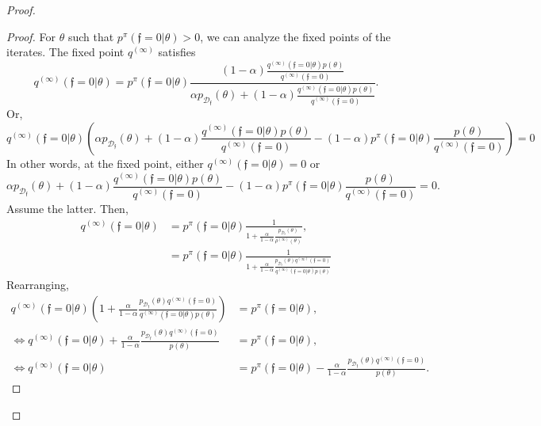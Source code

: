 \documentclass{article} %
\newcommand{\feas}{\mathfrak{f}}
\newcommand{\MeasuredCISet}{\mathcal{D}_{\feas{}}}
\begin{document}
\begin{proof}
\begin{proof}
For $\theta$ such that $p^\pi(\feas{}=0 | \theta) > 0$, we can analyze the fixed points of the iterates. The fixed point $q^{(\infty)}$ satisfies
\begin{equation}
    q^{(\infty)}(\feas{}=0 | \theta) = p^\pi(\feas{}=0 | \theta) \frac{ (1-\alpha) \frac{q^{(\infty)}(\feas{}=0|\theta) p(\theta) }{q^{(\infty)}(\feas{}=0)} }{ \alpha p_{\MeasuredCISet}(\theta) + (1-\alpha) \frac{q^{(\infty)}(\feas{}=0|\theta) p(\theta)}{q^{(\infty)}(\feas{}=0)} }.
\end{equation}
Or,
\begin{equation}
    q^{(\infty)}(\feas{}=0 | \theta)
    \left( \alpha p_{\MeasuredCISet}(\theta) + (1 - \alpha) \frac{ q^{(\infty)}(\feas{}=0|\theta) p(\theta) }{ q^{(\infty)}(\feas{}=0) } - (1-\alpha) p^\pi(\feas{}=0|\theta) \frac{p(\theta)}{q^{(\infty)}(\feas{}=0)} \right) = 0
\end{equation}
In other words, at the fixed point, either $q^{(\infty)}(\feas{}=0 | \theta) = 0$ or
\begin{equation}
    \alpha p_{\MeasuredCISet}(\theta) + (1 - \alpha) \frac{ q^{(\infty)}(\feas{}=0|\theta) p(\theta) }{ q^{(\infty)}(\feas{}=0) } - (1-\alpha) p^\pi(\feas{}=0|\theta) \frac{p(\theta)}{q^{(\infty)}(\feas{}=0)} = 0.
\end{equation}
Assume the latter. Then,
\begin{align}
    q^{(\infty)}(\feas{}=0 | \theta)
    &= p^\pi(\feas{}=0 | \theta) \frac{1}{1 + \frac{\alpha}{1-\alpha} \frac{ p_{\MeasuredCISet}(\theta) }{ \rho^{(\infty)}(\theta) } }, \\
    &= p^\pi(\feas{}=0 | \theta) \frac{1}{1 + \frac{\alpha}{1-\alpha} \frac{ p_{\MeasuredCISet}(\theta) q^{(\infty)}(\feas{} = 0) }{ q^{(\infty)}(\feas{}=0 | \theta) p(\theta) } }
\end{align}
Rearranging,
\begin{align}
    q^{(\infty)}(\feas{}=0 | \theta) \left(1 + \frac{\alpha}{1-\alpha} \frac{ p_{\MeasuredCISet}(\theta) q^{(\infty)}(\feas{} = 0) }{ q^{(\infty)}(\feas{}=0 | \theta) p(\theta) } \right)
    &= p^\pi(\feas{}=0 | \theta), \\
    \iff
    q^{(\infty)}(\feas{}=0 | \theta) + \frac{\alpha}{1-\alpha} \frac{ p_{\MeasuredCISet}(\theta) q^{(\infty)}(\feas{} = 0) }{ p(\theta) }
    &= p^\pi(\feas{}=0 | \theta), \\
    \iff
    q^{(\infty)}(\feas{}=0 | \theta)
    &= p^\pi(\feas{}=0 | \theta) - \frac{\alpha}{1-\alpha} \frac{ p_{\MeasuredCISet}(\theta) q^{(\infty)}(\feas{} = 0) }{ p(\theta) }.
\end{align}

\end{proof}
\end{proof}
\end{document}
